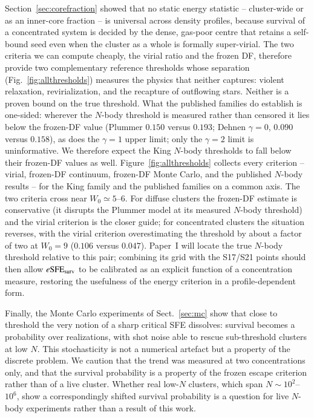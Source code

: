 \documentclass{aa}
\newcommand{\esfe}{e{\rm SFE}}
\begin{document}
Section~\ref{sec:corefraction} showed that no static energy statistic --
cluster-wide or as an inner-core fraction -- is universal across density
profiles, because survival of a concentrated system is decided by the
dense, gas-poor centre that retains a self-bound seed even when the
cluster as a whole is formally super-virial. The two criteria we can
compute cheaply, the virial ratio and the frozen DF, therefore provide
two complementary reference thresholds whose separation
(Fig.~\ref{fig:allthresholds}) measures the physics that neither
captures: violent relaxation, revirialization, and the recapture of
outflowing stars. Neither is a proven bound on the true threshold. What
the published families do establish is one-sided: wherever the $N$-body
threshold is measured rather than censored it lies below the frozen-DF
value (Plummer $0.150$ versus $0.193$; Dehnen $\gamma=0$, $0.090$ versus
$0.158$), as does the $\gamma=1$ upper limit; only the $\gamma=2$ limit
is uninformative. We therefore expect the King $N$-body thresholds to
fall below their frozen-DF values as well.
Figure~\ref{fig:allthresholds} collects every
criterion -- virial, frozen-DF continuum, frozen-DF Monte Carlo, and the
published $N$-body results -- for the King family and the published
families on a common axis. The two criteria cross near
$W_0\simeq5$--$6$. For diffuse clusters the frozen-DF
estimate is conservative (it disrupts the Plummer model at its measured
$N$-body threshold) and the virial criterion is the closer guide; for
concentrated clusters the situation reverses, with the virial criterion
overestimating the threshold by about a factor of two at $W_0=9$
($0.106$ versus $0.047$). Paper~I will locate the true $N$-body
threshold relative to this pair; combining its grid with the S17/S21
points should then allow $\esfe_{\rm surv}$ to be calibrated as an explicit
function of a concentration measure, restoring the usefulness of the
energy criterion in a profile-dependent form.

Finally, the Monte Carlo experiments of Sect.~\ref{sec:mc} show that
close to threshold the very notion of a sharp critical SFE dissolves:
survival becomes a probability over realizations, with shot noise able
to rescue sub-threshold clusters at low $N$. This stochasticity is not a
numerical artefact but a property of the discrete problem. We caution
that the trend was measured at two concentrations only, and that the
survival probability is a property of the frozen escape criterion rather
than of a live cluster. Whether real low-$N$ clusters, which span
$N\sim10^2$--$10^6$, show a correspondingly shifted survival probability
is a question for live $N$-body experiments rather than a result of this
work.
\end{document}
